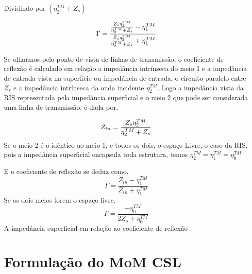 \documentclass[
	12pt,				%
	openright,			%
	oneside,			%
	a4papey79r,			%
	english,			%
	brazil				%
	]{abntex2}
\begin{document}
Dividindo por $(\eta_2^{TM}+Z_s) $

\begin{equation}{\label{CoefReflexaoParaleloZsEta2}}
   \Gamma= \frac{\frac{Z_s \eta_2^{TM} }{\eta_2^{TM}+Z_s}-\eta_1^{TM}}
    {\frac{Z_s \eta_2^{TM} }{\eta_2^{TM}+Z_s}+\eta_1^{TM}}
\end{equation}

Se olharmos pelo ponto de vista de linhas de transmissão, o coeficiente de reflexão  é calculado em relação a impedância intrínseca do meio 1 e a impedância de entrada vista na superfície ou impedância de entrada, o circuito paralelo  entre $Z_s$ e a impedância intrínseca da onda incidente $\eta^{TM}_{2}$. Logo a impedância vista da RIS representada pela impedância superficial e o meio 2 que pode ser considerada uma linha de transmissão, é dada por,

\begin{equation}{\label{ImpedanciaZinParaleloZsEta2}}
   Z_{in}= \frac{Z_s \eta_2^{TM} }{\eta_2^{TM}+Z_s}
\end{equation}
Se o meio 2 é o idêntico ao meio 1, e todos os dois, o espaço Livre, o caso da RIS, pois a impedância superficial encapsula toda estrutura, temos $\eta^{TM}_{2}=\eta^{TM}_1=\eta^{TM}_0$

E o coeficiente de reflexão se deduz como,
\begin{equation}
   \Gamma= \frac{Z_{in}-\eta_1^{TM}}
    {Z_{in}+\eta_1^{TM}}
\end{equation}
Se os dois meios forem o espaço livre,
\begin{equation}
    \Gamma=\frac{-\eta^{TM}_0}{2Z_s+\eta^{TM}_0}
\end{equation}
A impedância superficial em relação ao coeficiente de reflexão

\chapter{Formulação do MoM CSL}\label{FormulaçãoMoMCSL}
\end{document}

